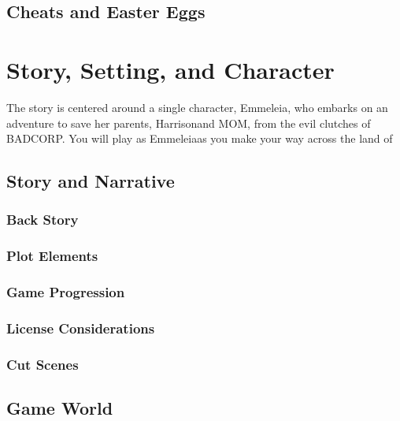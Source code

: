 \documentclass[12pt,titlepage]{article}
\newcommand{\protagonist}{Emmeleia}
\newcommand{\dad}{Harrison}
\newcommand{\mom}{MOM}
\newcommand{\evilCorp}{BADCORP}
\newcounter{subsubsubsection}[subsubsection]
\begin{document}
\subsection{Cheats and Easter Eggs}

\newpage
\section{Story, Setting, and Character}

The story is centered around a single character, \protagonist, who embarks on an
adventure to save her parents, \dad and \mom, from the evil clutches of
\evilCorp. You will play as \protagonist as you make your way across the land of


\subsection{Story and Narrative}


\subsubsection{Back Story}

\subsubsection{Plot Elements}

\subsubsection{Game Progression}

\subsubsection{License Considerations}

\subsubsection{Cut Scenes}




\subsection{Game World}
\end{document}
